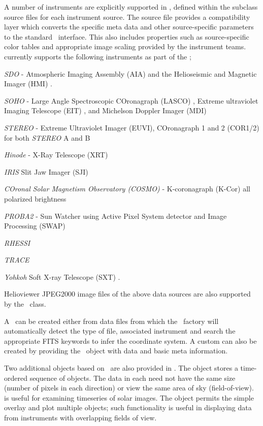 A number of instruments are explicitly supported in \sunpypkg, defined within the subclass source files for each instrument source. The source file provides a compatibility layer which converts the specific meta data and other source-specific parameters to the standard \GenericMap\ interface. This also includes properties such as source-specific color tables and appropriate image scaling provided by the instrument teams. \sunpypkg currently supports the following instruments as part of the \GenericMap;
\begin{inparaitem}
\item \textit{SDO} - Atmospheric Imaging Assembly (AIA) \citep{lemen2011atmospheric} and the Helioseismic and Magnetic Imager (HMI) \citep{scherrer2012helioseismic}. 
\item \textit{SOHO} - Large Angle Spectroscopic COronagraph (LASCO) \citep{brueckner1995large}, Extreme ultraviolet Imaging Telescope (EIT) \citep{delaboudiniere1995eit}, and Michelson Doppler Imager (MDI) \citep{scherrer1995solar}
\item \textit{STEREO} - Extreme Ultraviolet Imager (EUVI), COronagraph 1 and 2 (COR1/2) for both \textit{STEREO} A and B \citep{howard2008sun}
\item \textit{Hinode} - X-Ray Telescope (XRT) \citep{golub2008x}
\item \textit{IRIS} Slit Jaw Imager (SJI) \citep{DePontieu2014}
\item \textit{COronal Solar Magnetism Observatory (COSMO)} -  K-coronagraph (K-Cor) all polarized brightness
\item \textit{PROBA2} - Sun Watcher using Active Pixel System detector and Image Processing (SWAP) \citep{seaton2013swap}
\item \textit{RHESSI} \citep{lin2002reuven}
\item \textit{TRACE}
\item \textit{Yohkoh} Soft X-ray Telescope (SXT) \citep{tsuneta1991soft}.
\end{inparaitem}
Helioviewer JPEG2000 image files of the above data sources are also supported by the \Map\ class.

A \sunpy \Map\ can be created either from data files from which the \Map\ factory will automatically detect the type of file, associated instrument and search the appropriate FITS keywords to infer the coordinate system. A custom \GenericMap can also be created by providing the \Map\ object with data and basic meta information.

Two additional objects based on \Map\ are also provided in \sunpy. The  object stores a time-ordered sequence of \Map objects.  The data in each \Map need not have the same size (number of pixels in each direction) or view the same area of sky (field-of-view).  is useful for examining timeseries of solar images.  The  object permits the simple overlay and plot multiple \Map objects; such functionality is useful in displaying data from instruments with overlapping fields of view.


